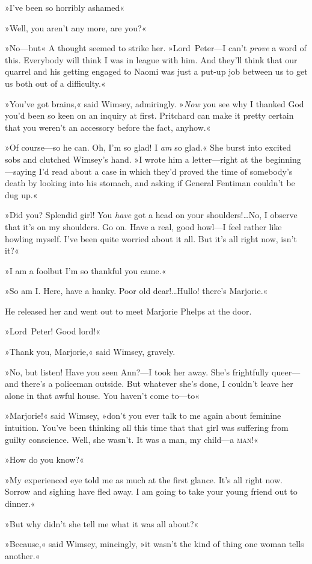 »I've been so horribly ashamed\longdash«

»Well, you aren't any more, are you?«

»No—but\longdash« A thought seemed to strike her. »Lord~Peter—I can't \textit{prove} a word of this. Everybody will think I was in league with him. And they'll think that our quarrel and his getting engaged to Naomi was just a put-up job between us to get us both out of a difficulty.«

»You've got brains,« said Wimsey, admiringly. »\textit{Now} you see why I thanked God you'd been so keen on an inquiry at first. Pritchard can make it pretty certain that you weren't an accessory before the fact, anyhow.«

»Of course—so he can. Oh, I'm so glad! I \textit{am} so glad.« She burst into excited sobs and clutched Wimsey's hand. »I wrote him a letter—right at the beginning—saying I'd read about a case in which they'd proved the time of somebody's death by looking into his stomach, and asking if General Fentiman couldn't be dug up.«

»Did you? Splendid girl! You \textit{have} got a head on your shoulders!\dots No, I observe that it's on my shoulders. Go on. Have a real, good howl—I feel rather like howling myself. I've been quite worried about it all. But it's all right now, isn't it?«

»I am a fool\textellipsis  but I'm so thankful you came.«

»So am I. Here, have a hanky. Poor old dear!\dots Hullo! there's Marjorie.«

He released her and went out to meet Marjorie Phelps at the door.

»Lord~Peter! Good lord!«

»Thank you, Marjorie,« said Wimsey, gravely.

»No, but listen! Have you seen Ann?—I took her away. She's frightfully queer—and there's a policeman outside. But whatever she's done, I couldn't leave her alone in that awful house. You haven't come to—to\longdash«

»Marjorie!« said Wimsey, »don't you ever talk to me again about feminine intuition. You've been thinking all this time that that girl was suffering from guilty conscience. Well, she wasn't. It was a man, my child—a \textsc{man}!«

»How do you know?«

»My experienced eye told me as much at the first glance. It's all right now. Sorrow and sighing have fled away. I am going to take your young friend out to dinner.«

»But why didn't she tell me what it was all about?«

»Because,« said Wimsey, mincingly, »it wasn't the kind of thing one woman tells another.«